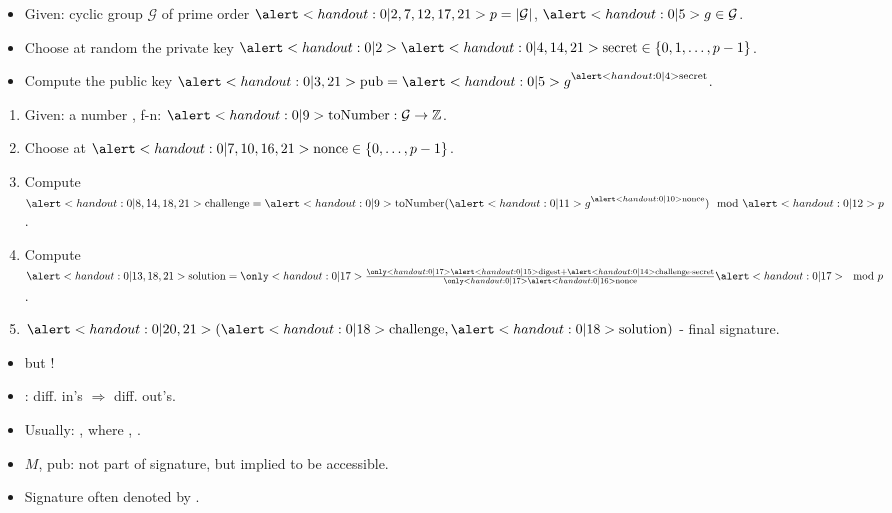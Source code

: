 \begin{frame}
\vskip -0.15cm
\begin{emptyTheorem}
\begin{itemize}

\item Given: cyclic group $\mathcal G$ of prime order $\alertNoH{2,7,12,17,21}{p=|\mathcal G|}$,  $\alertNoH{5}{g} \in \mathcal G$.
\item<2-> Choose at random the private key $\alertNoH{2}{ \alertNoH{4,14,21}{\mathrm{secret} \in \left\{0,1,\dots, p -1 \right\} }}$.
\item<3-> Compute the public key $\alertNoH{3,21}{\mathrm{pub} = {\alertNoH{5}{g}}^{\alertNoH{4}{\mathrm{secret}}}}$.
\end{itemize}
\end{emptyTheorem}
\vskip -0.15cm


\vskip -0.15cm
\begin{emptyTheorem}
\begin{enumerate}
\item<6-> Given: a number , f-n: $\alertNoH{9}{\mathrm{toNumber}:\mathcal G\to \mathbb Z}$.
\item<7-> Choose at  $\alertNoH{7,10,16,21}{\mathrm{nonce} \in \left\{0,\dots, p-1\right\}}$.
\item<8-> Compute $\alertNoH{8,14,18,21}{ \mathrm{challenge} =  \alertNoH{9}{\mathrm{toNumber}} ({\alertNoH{11} {g}}^{\alertNoH{10}{ \mathrm{nonce}}}) \mod \alertNoH{12}{p}} $.
\item<13-> Compute $\alertNoH{13,18,21}{ \mathrm{solution} = \onlyNoH{17}{\color{red}} \frac{\onlyNoH{17}{\color{black}} \alertNoH{15}{\mathrm{digest}} + \alertNoH{14}{\mathrm{challenge}\cdot \mathrm{secret}}  }{ \onlyNoH{17}{\color{black}} \alertNoH{16}{\mathrm{nonce}}}  \alertNoH{17}{\mod  p} }$.
\item<18-> $\alertNoH{20,21}{(\alertNoH{18}{\mathrm{challenge}}, \alertNoH{18}{\mathrm{solution}})} $ - final signature. 
\end{enumerate}
\end{emptyTheorem}
\vskip -0.2cm
\begin{itemize}
\item<3->  but ! 
\item<9-> : diff. in's $\Rightarrow$ diff. out's.
\item<15-> Usually: , where , . 
\item<19-> $M$, $\textrm{pub}$: not part of signature, but implied to be accessible.
\item<20-> Signature often denoted by .
\end{itemize}
\end{frame}

